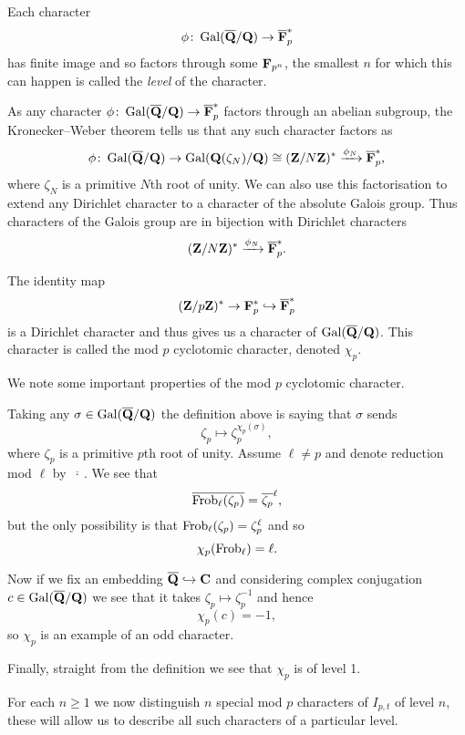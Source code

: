 \documentclass[a4paper,12pt]{article}
\begin{document}
\begin{defn}
Each character
\[
\phi \colon \operatorname{Gal}(\overline{\mathbf{Q}}/\mathbf{Q}) \to \overline{\mathbf{F}}_p^*
\]
has finite image and so factors through some $\mathbf{F}_{p^n}$, the smallest $n$ for which this can happen is called the \emph{level} of the character.
\end{defn}

As any character $\phi\colon\operatorname{Gal}(\overline{\mathbf{Q}}/\mathbf{Q}) \to \overline{\mathbf{F}}_p^*$ factors through an abelian subgroup, the Kronecker--Weber theorem tells us that any such character factors as
\[
\phi\colon\operatorname{Gal}(\overline{\mathbf{Q}}/\mathbf{Q}) \to \operatorname{Gal}(\mathbf{Q}(\zeta_N)/\mathbf{Q})\cong (\mathbf{Z}/N\mathbf{Z})^*\xrightarrow{\phi_N}\overline{\mathbf{F}}_p^*,
\]
where $\zeta_N$ is a primitive $N$th root of unity.
We can also use this factorisation to extend any Dirichlet character to a character of the absolute Galois group.
Thus characters of the Galois group are in bijection with Dirichlet characters
\[
(\mathbf{Z}/N\mathbf{Z})^* \xrightarrow{\phi_N}\overline{\mathbf{F}}_p^*.
\]



\begin{defn}
The identity map
\[
(\mathbf{Z}/p\mathbf{Z})^* \to \mathbf{F}_p^* \hookrightarrow \overline{\mathbf{F}}_p^*
\]
is a Dirichlet character and thus gives us a character of $\operatorname{Gal}(\overline{\mathbf{Q}}/\mathbf{Q})$.
This character is called the mod $p$ cyclotomic character, denoted $\chi_p$.
\end{defn}

\begin{rmk}
We note some important properties of the mod $p$ cyclotomic character.

Taking any $\sigma\in\operatorname{Gal}(\overline{\mathbf{Q}}/\mathbf{Q})$ the definition above is saying that $\sigma$ sends
\[
\zeta_p\mapsto \zeta_p^{\chi_p(\sigma)},
\]
where $\zeta_p$ is a primitive $p$th root of unity.
Assume $\ell \ne p$ and denote reduction mod $\ell$ by $\overline{\ \cdot\ }$.
We see that %
\[
\overline{\operatorname{Frob}_\ell(\zeta_p)} = \overline{\zeta_p}^\ell,
\]
but the only possibility is that $\operatorname{Frob}_\ell(\zeta_p) = \zeta_p^\ell$ and so
\[
\chi_p(\operatorname{Frob}_\ell) = \ell.
\]

Now if we fix an embedding $\overline{\mathbf{Q}}\hookrightarrow\mathbf{C}$ and considering complex conjugation $c\in\operatorname{Gal}(\overline{\mathbf{Q}}/\mathbf{Q})$ we see that it takes $\zeta_p \mapsto\zeta_p^{-1}$ and hence
\[
\chi_p(c) = -1,
\]
so $\chi_p$ is an example of an odd character.

Finally, straight from the definition we see that $\chi_p$ is of level 1.
\end{rmk}

For each $n \ge 1$ we now distinguish $n$ special mod $p$ characters of $I_{p,t}$ of level $n$, these will allow us to describe all such characters of a particular level.
\end{document}
